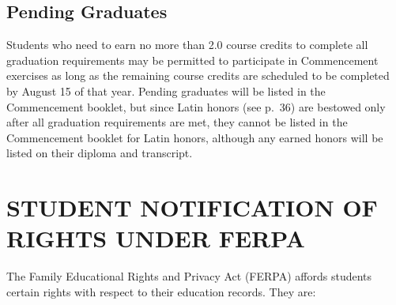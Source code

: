 \documentclass[
  letterpaper,
]{scrbook}
\begin{document}
\hypertarget{pending-graduates}{%
\section{Pending Graduates}\label{pending-graduates}}

Students who need to earn no more than 2.0 course credits to complete
all graduation requirements may be permitted to participate in
Commencement exercises as long as the remaining course credits are
scheduled to be completed by August 15 of that year. Pending graduates
will be listed in the Commencement booklet, but since Latin honors (see
p.~36) are bestowed only after all graduation requirements are met, they
cannot be listed in the Commencement booklet for Latin honors, although
any earned honors will be listed on their diploma and transcript.

\hypertarget{student-notification-of-rights-under-ferpa}{%
\chapter{STUDENT NOTIFICATION OF RIGHTS UNDER
FERPA}\label{student-notification-of-rights-under-ferpa}}

The Family Educational Rights and Privacy Act (FERPA) affords students
certain rights with respect to their education records. They are:
\end{document}
